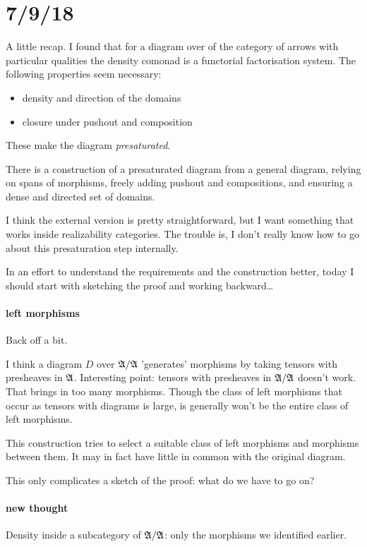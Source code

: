 \documentclass[csh.tex]{subfiles}
\begin{document}
\section{7/9/18}

A little recap. I found that for a diagram over of the category of arrows with particular qualities the density comonad is a functorial factorisation system. The following properties seem necessary:
\begin{itemize}
\item density and direction of the domains
\item closure under pushout and composition
\end{itemize}
These make the diagram \emph{presaturated}.

There is a construction of a presaturated diagram from a general diagram, relying on spans of morphisms, freely adding pushout and compositions, and ensuring a dense and directed set of domains.

I think the external version is pretty straightforward, but I want something that works inside realizability categories. The trouble is, I don't really know how to go about this presaturation step internally.

In an effort to understand the requirements and the construction better, today I should start with sketching the proof and working backward\dots

\paragraph{left morphisms}
Back off a bit.

I think a diagram $D$ over $\mathfrak A/\mathfrak A$ 'generates' morphisms by taking tensors with presheaves in $\mathfrak A$.  
Interesting point: tensors with presheaves in $\mathfrak A/\mathfrak A$ doesn't work. That brings in too many morphisms.
Though the class of left morphisms that occur as tensors with diagrams is large, is generally won't be the entire class of left morphisms. 

This construction tries to select a suitable class of left morphisms and morphisms between them.
It may in fact have little in common with the original diagram.

This only complicates a sketch of the proof: what do we have to go on?

\paragraph{new thought}
Density inside a subcategory of $\mathfrak A/\mathfrak A$: only the morphisms we identified earlier.
\end{document}
